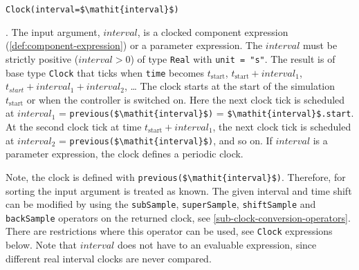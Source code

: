 \begin{operatordefinition*}[Clock]\label{modelica:clock-interval}
\begin{synopsis}\begin{lstlisting}
Clock(interval=$\mathit{interval}$)
\end{lstlisting}\end{synopsis}
\begin{semantics}
.
The input argument, $\mathit{interval}$, is a clocked component expression (\cref{def:component-expression}) or a parameter expression.
The $\mathit{interval}$ must be strictly positive ($\mathit{interval} > 0$) of type \lstinline!Real! with \lstinline!unit = "s"!.
The result is of base type \lstinline!Clock! that ticks when \lstinline!time! becomes $t_{\mathrm{start}}$, $t_{\mathrm{start}} + \mathit{interval}_{1}$, $t_{\mathit{start}} + \mathit{interval}_{1} + \mathit{interval}_{2}$, \@\ldots{}
The clock starts at the start of the simulation $t_{\mathrm{start}}$ or when the controller is switched on.
Here the next clock tick is scheduled at $\mathit{interval}_{1}$ = \lstinline!previous($\mathit{interval}$)! = \lstinline!$\mathit{interval}$.start!.
At the second clock tick at time $t_{\mathrm{start}} + \mathit{interval}_{1}$, the next clock tick is scheduled at $\mathit{interval}_{2}$ = \lstinline!previous($\mathit{interval}$)!, and so on.
If $\mathit{interval}$ is a parameter expression, the clock defines a periodic clock.

\begin{nonnormative}
Note, the clock is defined with \lstinline!previous($\mathit{interval}$)!.
Therefore, for sorting the input argument is treated as known.
The given interval and time shift can be modified by using the \lstinline!subSample!, \lstinline!superSample!, \lstinline!shiftSample! and \lstinline!backSample! operators on the returned clock, see \cref{sub-clock-conversion-operators}.
There are restrictions where this operator can be used, see \lstinline!Clock! expressions below.
Note that $\mathit{interval}$ does not have to an evaluable expression, since different real interval clocks are never compared.
\end{nonnormative}
\end{semantics}
\end{operatordefinition*}

